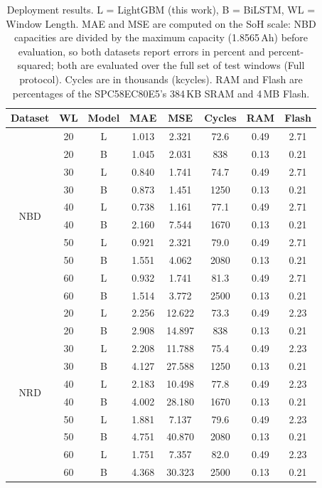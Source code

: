 \begin{table}[H]
    \centering
    \setcellgapes{3pt}
    \makegapedcells
    \begin{tabular}{c c c c c c c c}
    \hline
    Dataset & WL & Model & \makecell{MAE \\ \relax[\%]} & \makecell{MSE \\ \relax[\%$^2$]} & \makecell{Cycles \\ \relax[kcycles]} & \makecell{RAM \\ \relax[\%]} & \makecell{Flash \\ \relax[\%]} \\
    \hline
    \multirow{10}{*}{NBD}
    & 20 & L & 1.013 & 2.321 & 72.6 & 0.49 & 2.71 \\
    & 20 & B & 1.045 & 2.031 & 838 & 0.13 & 0.21 \\
    & 30 & L & 0.840 & 1.741 & 74.7 & 0.49 & 2.71 \\
    & 30 & B & 0.873 & 1.451 & 1250 & 0.13 & 0.21 \\
    & 40 & L & 0.738 & 1.161 & 77.1 & 0.49 & 2.71 \\
    & 40 & B & 2.160 & 7.544 & 1670 & 0.13 & 0.21 \\
    & 50 & L & 0.921 & 2.321 & 79.0 & 0.49 & 2.71 \\
    & 50 & B & 1.551 & 4.062 & 2080 & 0.13 & 0.21 \\
    & 60 & L & 0.932 & 1.741 & 81.3 & 0.49 & 2.71 \\
    & 60 & B & 1.514 & 3.772 & 2500 & 0.13 & 0.21 \\
    \hline
    \multirow{10}{*}{NRD}
    & 20 & L & 2.256 & 12.622 & 73.3 & 0.49 & 2.23 \\
    & 20 & B & 2.908 & 14.897 & 838 & 0.13 & 0.21 \\
    & 30 & L & 2.208 & 11.788 & 75.4 & 0.49 & 2.23 \\
    & 30 & B & 4.127 & 27.588 & 1250 & 0.13 & 0.21 \\
    & 40 & L & 2.183 & 10.498 & 77.8 & 0.49 & 2.23 \\
    & 40 & B & 4.002 & 28.180 & 1670 & 0.13 & 0.21 \\
    & 50 & L & 1.881 & 7.137 & 79.6 & 0.49 & 2.23 \\
    & 50 & B & 4.751 & 40.870 & 2080 & 0.13 & 0.21 \\
    & 60 & L & 1.751 & 7.357 & 82.0 & 0.49 & 2.23 \\
    & 60 & B & 4.368 & 30.323 & 2500 & 0.13 & 0.21 \\
    \hline
    \end{tabular}
    \caption{Deployment results. L = LightGBM (this work), B = BiLSTM, WL = Window Length. MAE and MSE are computed on the SoH scale: NBD capacities are divided by the maximum capacity (1.8565\,Ah) before evaluation, so both datasets report errors in percent and percent-squared; both are evaluated over the full set of test windows (Full protocol). Cycles are in thousands (kcycles). RAM and Flash are percentages of the SPC58EC80E5's 384\,KB SRAM and 4\,MB Flash.}
    \label{tab:deployment}
\end{table}

